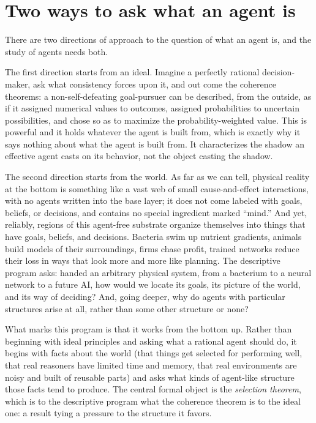 \documentclass[10pt]{article}
\theoremstyle{definition}
\theoremstyle{remark}
\begin{document}
\section{Two ways to ask what an agent is}
\label{sec:intro}

There are two directions of approach to the question of what an agent is, and the study of agents needs both.

The first direction starts from an ideal. Imagine a perfectly rational decision-maker, ask what consistency forces upon it, and out come the coherence theorems: a non-self-defeating goal-pursuer can be described, from the outside, as if it assigned numerical values to outcomes, assigned probabilities to uncertain possibilities, and chose so as to maximize the probability-weighted value. This is powerful and it holds whatever the agent is built from, which is exactly why it says nothing about what the agent is built from. It characterizes the shadow an effective agent casts on its behavior, not the object casting the shadow.

The second direction starts from the world. As far as we can tell, physical reality at the bottom is something like a vast web of small cause-and-effect interactions, with no agents written into the base layer; it does not come labeled with goals, beliefs, or decisions, and contains no special ingredient marked ``mind.'' And yet, reliably, regions of this agent-free substrate organize themselves into things that have goals, beliefs, and decisions. Bacteria swim up nutrient gradients, animals build models of their surroundings, firms chase profit, trained networks reduce their loss in ways that look more and more like planning. The descriptive program asks: handed an arbitrary physical system, from a bacterium to a neural network to a future AI, how would we locate its goals, its picture of the world, and its way of deciding? And, going deeper, why do agents with particular structures arise at all, rather than some other structure or none?

What marks this program is that it works from the bottom up. Rather than beginning with ideal principles and asking what a rational agent should do, it begins with facts about the world (that things get selected for performing well, that real reasoners have limited time and memory, that real environments are noisy and built of reusable parts) and asks what kinds of agent-like structure those facts tend to produce. The central formal object is the \emph{selection theorem}, which is to the descriptive program what the coherence theorem is to the ideal one: a result tying a pressure to the structure it favors.
\end{document}
